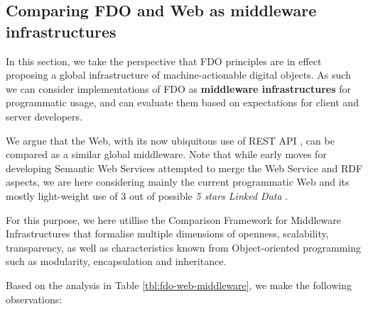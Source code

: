 \documentclass[fleqn,10pt,lineno]{wlpeerjlua}
\begin{document}


\subsection*{Comparing FDO and Web as middleware infrastructures}\label{sec:middleware}

In this section, we take the perspective that FDO principles are in effect proposing a global infrastructure of machine-actionable digital objects. As such we can consider implementations of FDO as \textbf{middleware infrastructures} for programmatic usage, and can evaluate them based on expectations for client and server developers.

We argue that the Web, with its now ubiquitous use of REST API \autocite{fieldingArchitecturalStylesDesign2000a}, can be compared as a similar global middleware. Note that while early moves for developing Semantic Web Services \autocite{fenselSemanticWebServices2011} attempted to merge the Web Service and RDF aspects, we are here considering mainly the current programmatic Web and its mostly light-weight use of 3 out of possible \emph{5 stars Linked Data} \autocite{OpenData}.

For this purpose, we here utillise the Comparison Framework for Middleware Infrastructures \autocite{zarrasComparisonFrameworkMiddleware2004a} that formalise multiple dimensions of openness, scalability, transparency, as well as characteristics known from Object-oriented programming such as modularity, encapsulation and inheritance.

Based on the analysis in Table \vref{tbl:fdo-web-middleware}, we make the following observations:
\end{document}
